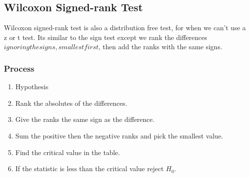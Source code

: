     \subsection{Wilcoxon Signed-rank Test}
    
        Wilcoxon signed-rank test is also a distribution free test, for when we can't use a z or t test. Its similar to the sign test except we rank the differences \(ignoring the signs, smallest first\), then add the ranks with the same signs.
        
        \subsubsection{Process}
            \begin{enumerate}
                \item Hypothesis
                \item Rank the absolutes of the differences.
                \item Give the ranks the same sign as the difference.
                \item Sum the positive then the negative ranks and pick the smallest value.
                \item Find the critical value in the table.
                \item If the statistic is less than the critical value reject $H_0$.
            \end{enumerate}
            
